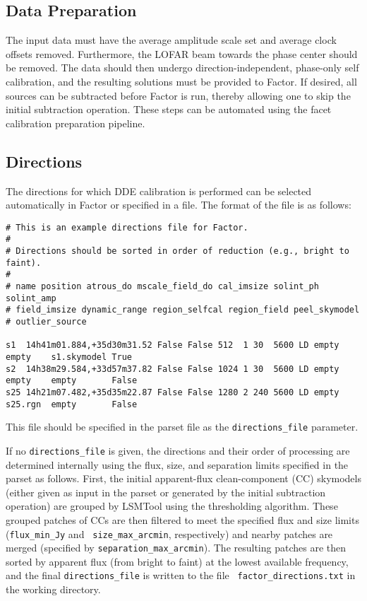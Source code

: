 \documentclass[structabstract]{article}
\begin{document}
\subsection{Data Preparation}
\label{factor:data}

The input data must have the average amplitude scale set and average clock
offsets removed. Furthermore, the LOFAR beam towards the phase center should be
removed. The data should then undergo direction-independent, phase-only self
calibration, and the resulting solutions must be provided to Factor. If desired,
all sources can be subtracted before Factor is run, thereby allowing one to skip
the initial subtraction operation. These steps can be automated using the facet
calibration preparation pipeline.

\subsection{Directions}
\label{factor:directions}

The directions for which DDE calibration is performed can be selected
automatically in Factor or specified in a file. The format of the file is as
follows:

\begin{verbatim}
# This is an example directions file for Factor.
#
# Directions should be sorted in order of reduction (e.g., bright to faint).
#
# name position atrous_do mscale_field_do cal_imsize solint_ph solint_amp
# field_imsize dynamic_range region_selfcal region_field peel_skymodel
# outlier_source

s1  14h41m01.884,+35d30m31.52 False False 512  1 30  5600 LD empty empty    s1.skymodel True
s2  14h38m29.584,+33d57m37.82 False False 1024 1 30  5600 LD empty empty    empty       False
s25 14h21m07.482,+35d35m22.87 False False 1280 2 240 5600 LD empty s25.rgn  empty       False
\end{verbatim}
This file should be specified in the parset file as the {\tt directions\_file}
parameter.

If no {\tt directions\_file} is given, the directions and their order of
processing are determined internally using the flux, size, and separation limits
specified in the parset as follows. First, the initial apparent-flux
clean-component (CC) skymodels (either given as input in the parset or generated
by the initial subtraction operation) are grouped by LSMTool using the
thresholding algorithm. These grouped patches of CCs are then filtered to meet
the specified flux and size limits ({\tt flux\_min\_Jy} and {\tt
size\_max\_arcmin}, respectively) and nearby patches are merged (specified by
{\tt separation\_max\_arcmin}). The resulting patches are then sorted by
apparent flux (from bright to faint) at the lowest available frequency, and the
final {\tt directions\_file} is written to the file {\tt
factor\_directions.txt} in the working directory.
\end{document}

